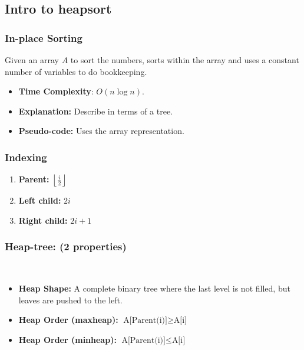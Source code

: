 \subsection{Intro to heapsort}
    \subsubsection{In-place Sorting}
    \begin{definition}
        Given an array \( A \) to sort the numbers, sorts within the array and uses a constant number of variables to do bookkeeping.
        \begin{itemize}
            \item \textbf{Time Complexity}: \( O(n \log n) \).
            \item \textbf{Explanation:} Describe in terms of a tree.
            \item \textbf{Pseudo-code:} Uses the array representation.
        \end{itemize}
    \end{definition}


    \subsubsection{Indexing}
    \begin{definition}
        \begin{enumerate}
            \item \textbf{Parent:} $\left \lfloor \frac{i}{2} \right \rfloor$
            \item \textbf{Left child:} $2i$
            \item \textbf{Right child:} $2i+1$
        \end{enumerate}
    \end{definition}

    \subsubsection{Heap-tree: (2 properties)}\
    \begin{definition}
        \begin{itemize}
            \item \textbf{Heap Shape:} A complete binary tree where the last level is not filled, but leaves are pushed to the left.
            \item \textbf{Heap Order (maxheap):} $\text{A[Parent(i)]}\geq \text{A[i]}$
            \item \textbf{Heap Order (minheap):} $\text{A[Parent(i)]}\leq \text{A[i]}$
        \end{itemize}
    \end{definition}

